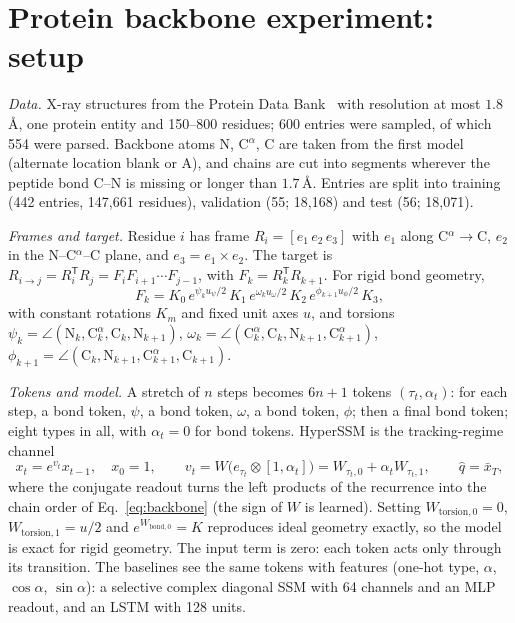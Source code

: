 \documentclass[aps,prx,reprint,superscriptaddress,longbibliography,nofootinbib,floatfix]{revtex4-2}
\theoremstyle{plain}
\theoremstyle{definition}
\begin{document}
\section{Protein backbone experiment: setup}\label{sm:protein}

\emph{Data.} X-ray structures from the Protein Data Bank~\cite{pdb}
with resolution at most $1.8$\,\AA, one protein entity and 150--800
residues; 600 entries were sampled, of which 554 were parsed. Backbone atoms
N, C$^\alpha$, C are taken from the first model (alternate location blank or
A), and chains are cut into segments wherever the peptide bond C--N is
missing or longer than $1.7$\,\AA. Entries are split into training (442
entries, 147{,}661 residues), validation (55; 18{,}168) and test (56;
18{,}071).

\emph{Frames and target.} Residue $i$ has frame
$R_i=[e_1\,e_2\,e_3]$ with $e_1$ along C$^\alpha\!\to$C, $e_2$ in the
N--C$^\alpha$--C plane, and $e_3=e_1\times e_2$. The target is
$R_{i\to j}=R_i^{\mathsf T}R_j=F_iF_{i+1}\cdots F_{j-1}$, with
$F_k=R_k^{\mathsf T}R_{k+1}$. For rigid bond geometry,
\begin{equation}
F_k=K_0\,e^{\psi_k u_\psi/2}\,K_1\,e^{\omega_k u_\omega/2}\,K_2\,e^{\phi_{k+1}u_\phi/2}\,K_3,
\label{eq:backbone}
\end{equation}
with constant rotations $K_m$ and fixed unit axes $u$, and torsions
$\psi_k=\angle(\mathrm N_k,\mathrm C^\alpha_k,\mathrm C_k,\mathrm N_{k+1})$,
$\omega_k=\angle(\mathrm C^\alpha_k,\mathrm C_k,\mathrm N_{k+1},\mathrm C^\alpha_{k+1})$,
$\phi_{k+1}=\angle(\mathrm C_k,\mathrm N_{k+1},\mathrm C^\alpha_{k+1},\mathrm C_{k+1})$.

\emph{Tokens and model.} A stretch of $n$ steps becomes $6n+1$
tokens $(\tau_t,\alpha_t)$: for each step, a bond token, $\psi$, a bond token,
$\omega$, a bond token, $\phi$; then a final bond token; eight types in all,
with $\alpha_t=0$ for bond tokens. HyperSSM is the tracking-regime channel
\begin{equation}
x_t=e^{v_t}x_{t-1},\quad x_0=1,\qquad v_t=W\bigl(e_{\tau_t}\otimes[1,\alpha_t]\bigr)=W_{\tau_t,0}+\alpha_tW_{\tau_t,1},\qquad \hat q=\bar x_T,
\end{equation}
where the conjugate readout turns the left products of the recurrence into
the chain order of Eq.~\eqref{eq:backbone} (the sign of $W$ is learned).
Setting $W_{\text{torsion},0}=0$, $W_{\text{torsion},1}=u/2$ and
$e^{W_{\text{bond},0}}=K$ reproduces ideal geometry exactly, so the model is
exact for rigid geometry. The input term is zero: each token acts only
through its transition. The baselines see the same tokens with features
(one-hot type, $\alpha$, $\cos\alpha$, $\sin\alpha$): a selective complex
diagonal SSM with 64 channels and an MLP readout, and an LSTM with 128
units.
\end{document}
